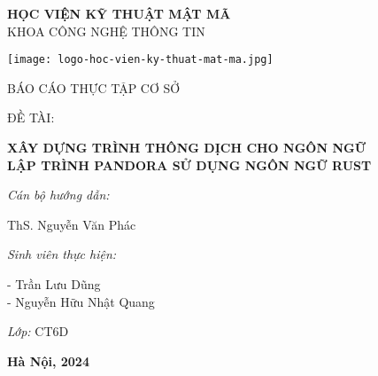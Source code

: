 \NoBgThispage
{}

\fontsize{16}{19.2pt}\selectfont 
\vspace{-1cm}
\begin{center}
    \textbf{ HỌC VIỆN KỸ THUẬT MẬT MÃ}\\
    KHOA CÔNG NGHỆ THÔNG TIN
\end{center}



\vspace{-0.5cm}

\begin{center}
    \texttt{[image: logo-hoc-vien-ky-thuat-mat-ma.jpg]}
\end{center}

\vspace{-1cm}
\begin{center}
    BÁO CÁO THỰC TẬP CƠ SỞ \\
\end{center}

\vspace{-0.5cm}
ĐỀ TÀI:
\fontsize{18}{21.6pt}\selectfont 
\begin{center}
    \textbf{XÂY DỰNG TRÌNH THÔNG DỊCH CHO NGÔN NGỮ\\LẬP TRÌNH PANDORA SỬ DỤNG NGÔN NGỮ RUST\\}
\end{center}

\vspace{1cm}
{\bf{
    \hspace{\parindent}\textit{Cán bộ hướng dẫn:}

     ThS. Nguyễn Văn Phác

    \hspace{\parindent}\textit{Sinh viên thực hiện:}

     - Trần Lưu Dũng\\
     - Nguyễn Hữu Nhật Quang
    
    \hspace{\parindent}\textit{Lớp: } CT6D
    
}}

\vfill 
\begin{center}
   \bf{Hà Nội, 2024}
\end{center}
